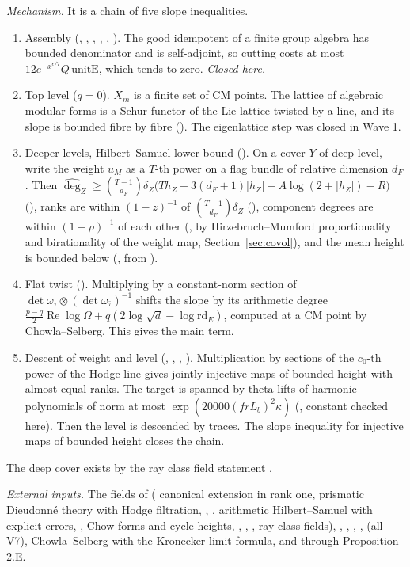 \documentclass[11pt]{article}
\theoremstyle{remark}
\begin{document}
\emph{Mechanism.} It is a chain of five slope inequalities.
\begin{enumerate}[label=(\roman*),nosep]
\item Assembly (, , , , , ). The good idempotent of a finite group algebra has bounded denominator and is self-adjoint, so cutting costs at most $12e^{-x^{\epsilon/7}}Q\,\mathrm{unitE}$, which tends to zero. \emph{Closed here.}
\item Top level ($q=0$). $X_m$ is a finite set of CM points. The lattice of algebraic modular forms is a Schur functor of the Lie lattice twisted by a line, and its slope is bounded fibre by fibre (). The eigenlattice step  was closed in Wave 1.
\item Deeper levels, Hilbert--Samuel lower bound (). On a cover $Y$ of deep level, write the weight $u_M$ as a $T$-th power on a flag bundle of relative dimension $d_F$. Then $\widehat{\deg}_Z\ge\binom{T-1}{d_F}\delta_Z\bigl(Th_Z-3(d_F+1)\lvert h_Z\rvert-A\log(2+\lvert h_Z\rvert)-R\bigr)$ (), ranks are within $(1-z)^{-1}$ of $\binom{T-1}{d_F}\delta_Z$ (), component degrees are within $(1-\rho)^{-1}$ of each other (, by Hirzebruch--Mumford proportionality and birationality of the weight map, Section~\ref{sec:covol}), and the mean height is bounded below (, from ).
\item Flat twist (). Multiplying by a constant-norm section of $\det\omega_\tau\otimes(\det\omega_{\bar\tau})^{-1}$ shifts the slope by its arithmetic degree $\tfrac{p-q}2\operatorname{Re}\log\Omega+q(2\log\sqrt d-\log\mathrm{rd}_E)$, computed at a CM point by Chowla--Selberg. This gives the main term.
\item Descent of weight and level (, , , ). Multiplication by sections of the $c_0$-th power of the Hodge line gives jointly injective maps of bounded height with almost equal ranks. The target is spanned by theta lifts of harmonic polynomials of norm at most $\exp(20000(frL_b)^2\kappa)$ (, constant checked here). Then the level is descended by traces. The slope inequality for injective maps of bounded height closes the chain.
\end{enumerate}
The deep cover exists by the ray class field statement .

\emph{External inputs.} The fields of  ( canonical extension in rank one,  prismatic Dieudonn\'e theory with Hodge filtration, , ,  arithmetic Hilbert--Samuel with explicit errors, ,  Chow forms and cycle heights, , , ,  ray class fields), , , , ,  (all V7), Chowla--Selberg with the Kronecker limit formula, and  through Proposition 2.E.
\end{document}
